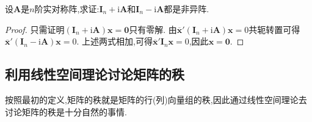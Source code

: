 \documentclass[lang=cn,newtx,10pt,scheme=chinese]{elegantbook}
\begin{document}
\begin{proposition}\label{proposition:实对称矩阵性质11}
设\(\boldsymbol{A}\)是\(n\)阶实对称阵,求证:\(\boldsymbol{I}_n + \mathrm{i}\boldsymbol{A}\)和\(\boldsymbol{I}_n - \mathrm{i}\boldsymbol{A}\)都是非异阵.
\end{proposition}
\begin{proof}
只需证明\((\boldsymbol{I}_n + \mathrm{i}\boldsymbol{A})\boldsymbol{x}=\boldsymbol{0}\)只有零解. 由\(\overline{\boldsymbol{x}}'(\boldsymbol{I}_n + \mathrm{i}\boldsymbol{A})\boldsymbol{x}=0\)共轭转置可得\(\overline{\boldsymbol{x}}'(\boldsymbol{I}_n - \mathrm{i}\boldsymbol{A})\boldsymbol{x}=0\). 上述两式相加,可得\(\overline{\boldsymbol{x}}'\boldsymbol{I}_n\boldsymbol{x}=0\),因此\(\boldsymbol{x}=\boldsymbol{0}\).
\end{proof}


\subsection{利用线性空间理论讨论矩阵的秩}
按照最初的定义,矩阵的秩就是矩阵的行(列)向量组的秩,因此通过线性空间理论去讨论矩阵的秩是十分自然的事情.
\end{document}
